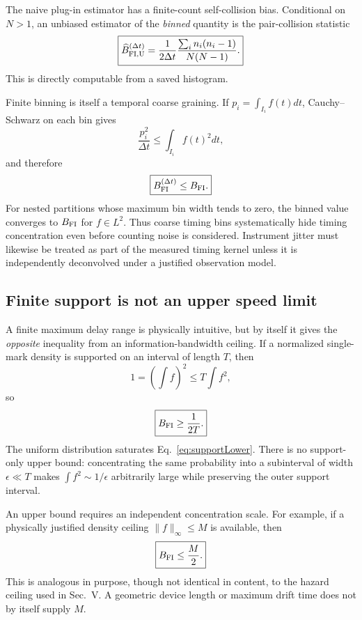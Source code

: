 The naive plug-in estimator has a finite-count self-collision bias. Conditional on $N>1$, an unbiased estimator of the \emph{binned} quantity is the pair-collision statistic
\begin{equation}
\boxed{
\widehat B_{\rm FI,U}^{(\Delta t)}
=\frac{1}{2\Delta t}
\frac{\sum_i n_i(n_i-1)}{N(N-1)}.}
\label{eq:histUnbiased}
\end{equation}
This is directly computable from a saved histogram.

Finite binning is itself a temporal coarse graining. If $p_i=\int_{I_i}f(t)dt$, Cauchy--Schwarz on each bin gives
\begin{equation}
\frac{p_i^2}{\Delta t}\le\int_{I_i}f(t)^2dt,
\end{equation}
and therefore
\begin{equation}
\boxed{B_{\rm FI}^{(\Delta t)}\le B_{\rm FI}.}
\label{eq:binLower}
\end{equation}
For nested partitions whose maximum bin width tends to zero, the binned value converges to $B_{\rm FI}$ for $f\in L^2$. Thus coarse timing bins systematically hide timing concentration even before counting noise is considered. Instrument jitter must likewise be treated as part of the measured timing kernel unless it is independently deconvolved under a justified observation model.

\subsection{Finite support is not an upper speed limit}
\label{sec:supportCaution}

A finite maximum delay range is physically intuitive, but by itself it gives the \emph{opposite} inequality from an information-bandwidth ceiling. If a normalized single-mark density is supported on an interval of length $T$, then
\begin{equation}
1=\left(\int f\right)^2\le T\int f^2,
\end{equation}
so
\begin{equation}
\boxed{B_{\rm FI}\ge\frac{1}{2T}.}
\label{eq:supportLower}
\end{equation}
The uniform distribution saturates Eq.~\eqref{eq:supportLower}. There is no support-only upper bound: concentrating the same probability into a subinterval of width $\epsilon\ll T$ makes $\int f^2\sim1/\epsilon$ arbitrarily large while preserving the outer support interval.

An upper bound requires an independent concentration scale. For example, if a physically justified density ceiling $\|f\|_\infty\le M$ is available, then
\begin{equation}
\boxed{B_{\rm FI}\le\frac{M}{2}.}
\label{eq:densityCeiling}
\end{equation}
This is analogous in purpose, though not identical in content, to the hazard ceiling used in Sec.~V. A geometric device length or maximum drift time does not by itself supply $M$.

